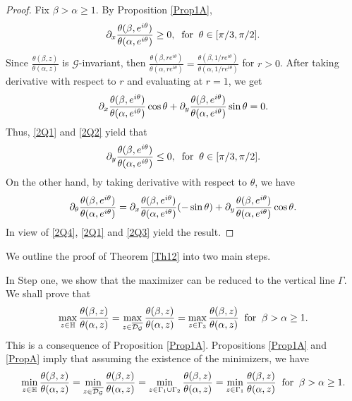 \documentclass[reqno,english]{amsart}
\newtheorem{open problem}{Open Problem}[section]
\newtheorem{open question}{Open Question}[section]
\newtheorem{open questions on hexagonal lattice}{Open Questions on hexagonal lattice}[section]
\begin{document}
\begin{proof}
Fix $\beta>\alpha\geq1$. By Proposition \ref{Prop1A},
 \begin{equation}\aligned\label{2Q1}
\partial_x\frac{\theta(\beta,e^{i\theta})}{\theta(\alpha,e^{i\theta})}\geq0,\;\;\hbox{for}\;\;\theta\in[\pi/3,\pi/2].
\endaligned\end{equation}
Since $\frac{\theta(\beta,z)}{\theta(\alpha,z)}$ is $\mathcal{G}$-invariant, then
 $\frac{\theta(\beta,re^{i\theta})}{\theta(\alpha,re^{i\theta})}=\frac{\theta(\beta,1/re^{i\theta})}{\theta(\alpha,1/re^{i\theta})}$ for $r>0$.
After taking derivative with respect to $r$ and evaluating at $r=1$, we get
 \begin{equation}\aligned\label{2Q2}
\partial_x\frac{\theta(\beta,e^{i\theta})}{\theta(\alpha,e^{i\theta})}
\cos\theta+\partial_y\frac{\theta(\beta,e^{i\theta})}{\theta(\alpha,e^{i\theta})}
\sin\theta=0.
\endaligned\end{equation}
Thus, \eqref{2Q1} and \eqref{2Q2} yield that
 \begin{equation}\aligned\label{2Q3}
\partial_y\frac{\theta(\beta,e^{i\theta})}{\theta(\alpha,e^{i\theta})}\leq0,\;\;\hbox{for}\;\;\theta\in[\pi/3,\pi/2].
\endaligned\end{equation}
On the other hand, by taking derivative with respect to $\theta$, we have
 \begin{equation}\aligned\label{2Q4}
\partial_\theta\frac{\theta(\beta,e^{i\theta})}{\theta(\alpha,e^{i\theta})}
=\partial_x\frac{\theta(\beta,e^{i\theta})}{\theta(\alpha,e^{i\theta})}(-\sin\theta)
+\partial_y\frac{\theta(\beta,e^{i\theta})}{\theta(\alpha,e^{i\theta})}\cos\theta.
\endaligned\end{equation}
In view of \eqref{2Q4}, \eqref{2Q1} and \eqref{2Q3} yield the result.


\end{proof}


We outline the proof of Theorem \ref{Th12} into two main steps.




In Step one, we show that the maximizer can be reduced to the vertical line $\Gamma$.
We shall prove that
 \begin{equation}\aligned
\max_{z\in\mathbb{H}}\frac{\theta(\beta,z)}{\theta(\alpha,z)}
=\max_{z\in\overline{\mathcal{D}_{\mathcal{G}}}}\frac{\theta(\beta,z)}{\theta(\alpha,z)}
=\max_{z\in\Gamma_3}\frac{\theta(\beta,z)}{\theta(\alpha,z)}\;\;\hbox{for}\;\;\beta>\alpha\geq1.
\endaligned\end{equation}
This is a consequence of Proposition \ref{Prop1A}. Propositions \ref{Prop1A} and \ref {PropA} imply that
assuming the existence of the minimizers, we have
\begin{equation}\aligned
\min_{z\in\mathbb{H}}\frac{\theta(\beta,z)}{\theta(\alpha,z)}
=\min_{z\in\overline{\mathcal{D}_{\mathcal{G}}}}\frac{\theta(\beta,z)}{\theta(\alpha,z)}
=\min_{z\in\Gamma_1\cup\Gamma_2}\frac{\theta(\beta,z)}{\theta(\alpha,z)}
=\min_{z\in\Gamma_1}\frac{\theta(\beta,z)}{\theta(\alpha,z)}
\;\;\hbox{for}\;\;\beta>\alpha\geq1.
\endaligned\end{equation}
\end{document}
